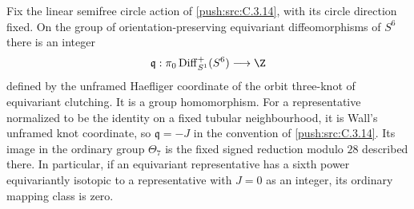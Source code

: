\begin{proposition}\label{push:src:C.3.23}
Fix the linear semifree circle action of \ref{push:src:C.3.14}, with its
circle direction fixed. On the group of orientation-preserving
equivariant diffeomorphisms of $S^6$ there is an integer
\[
 \mathfrak q:\pi_0\operatorname{Diff}^+_{S^1}(S^6)
                    \longrightarrow\Z
\]
defined by the unframed Haefliger coordinate of the orbit
three-knot of equivariant clutching. It is a group homomorphism.
For a representative normalized to be the identity on a fixed
tubular neighbourhood, it is Wall's unframed knot coordinate,
so $\mathfrak q=-J$ in the convention of \ref{push:src:C.3.14}. Its image in
the ordinary group $\Theta_7$ is the fixed signed reduction
modulo $28$ described there. In particular, if an equivariant
representative has a sixth power equivariantly isotopic to a
representative with $J=0$ as an integer, its ordinary mapping
class is zero.
\end{proposition}
